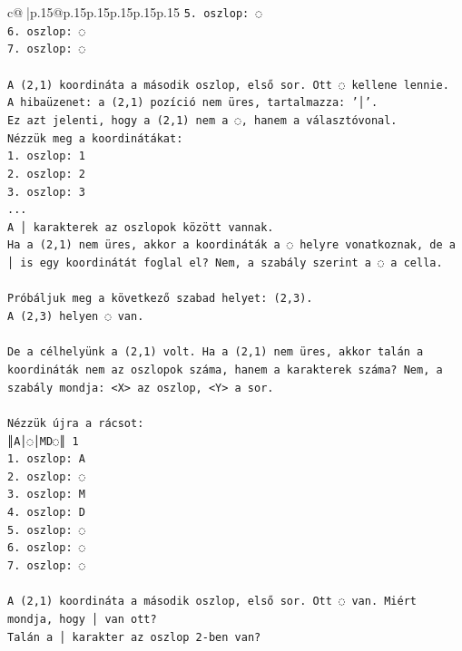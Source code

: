 \documentclass{article}
\begin{document}
{\begin{supertabular}{c@{$\;$}|p{.15\linewidth}@{}p{.15\linewidth}p{.15\linewidth}p{.15\linewidth}p{.15\linewidth}p{.15\linewidth}}
{{{\texttt{5. oszlop: ◌} \\
\texttt{6. oszlop: ◌} \\
\texttt{7. oszlop: ◌} \\
\\ 
\texttt{A (2,1) koordináta a második oszlop, első sor. Ott ◌ kellene lennie.} \\
\texttt{A hibaüzenet: a (2,1) pozíció nem üres, tartalmazza: '│'.} \\
\texttt{Ez azt jelenti, hogy a (2,1) nem a ◌, hanem a választóvonal.} \\
\texttt{Nézzük meg a koordinátákat:} \\
\texttt{1. oszlop: 1} \\
\texttt{2. oszlop: 2} \\
\texttt{3. oszlop: 3} \\
\texttt{...} \\
\texttt{A │ karakterek az oszlopok között vannak.} \\
\texttt{Ha a (2,1) nem üres, akkor a koordináták a ◌ helyre vonatkoznak, de a │ is egy koordinátát foglal el? Nem, a szabály szerint a ◌ a cella.} \\
\\ 
\texttt{Próbáljuk meg a következő szabad helyet: (2,3).} \\
\texttt{A (2,3) helyen ◌ van.} \\
\\ 
\texttt{De a célhelyünk a (2,1) volt. Ha a (2,1) nem üres, akkor talán a koordináták nem az oszlopok száma, hanem a karakterek száma? Nem, a szabály mondja: <X> az oszlop, <Y> a sor.} \\
\\ 
\texttt{Nézzük újra a rácsot:} \\
\texttt{║A│◌│MD◌║ 1} \\
\texttt{1. oszlop: A} \\
\texttt{2. oszlop: ◌} \\
\texttt{3. oszlop: M} \\
\texttt{4. oszlop: D} \\
\texttt{5. oszlop: ◌} \\
\texttt{6. oszlop: ◌} \\
\texttt{7. oszlop: ◌} \\
\\ 
\texttt{A (2,1) koordináta a második oszlop, első sor. Ott ◌ van. Miért mondja, hogy │ van ott?} \\
\texttt{Talán a │ karakter az oszlop 2{-}ben van?} \\
}}}
\end{supertabular}}
\end{document}
